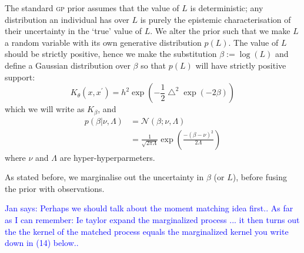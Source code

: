 \documentclass{article}
\newcommand\jansays[1]{\textcolor{blue}{Jan says: #1}}
\begin{document}
The standard {\scshape gp} prior assumes that the value of $L$ is deterministic; any distribution an individual has over $L$ is purely the epistemic characterisation of their uncertainty in the `true' value of $L$. We alter the prior such that we make $L$ a random variable with its own generative distribution $p(L)$. The value of $L$ should be strictly positive, %
hence we make the substitution $\beta := \log(L)$ and define a Gaussian distribution over $\beta$ so that $p(L)$ will have strictly positive support: 
\begin{equation}\label{betaSEkernel}
K_\theta(x,x^\prime) = h^2 \exp \left( -\frac{1}{2}\bigtriangleup^2 \exp(-2\beta) \right)
\end{equation}
which we will write as $K_\beta$, and
\begin{align}
p(\beta|\nu,\Lambda) &= \mathcal{N}(\beta; \nu, \Lambda) \nonumber\\
&= \frac{1}{\sqrt{2 \pi \Lambda}} \exp \left( \frac{ -(\beta - \nu)^2}{2\Lambda} \right) \label{betapdf}
\end{align}
where $\nu$ and $\Lambda$ are hyper-hyperparmeters.

As stated before, we marginalise out the uncertainty in $\beta$ (or $L$), before fusing the prior with observations. 

\jansays{Perhaps we should talk about the moment matching idea first.. As far as I can remember: Ie taylor expand the marginalized process ... it then turns out the the kernel of the matched process equals the marginalized kernel you write down in (14) below..}
\end{document}

